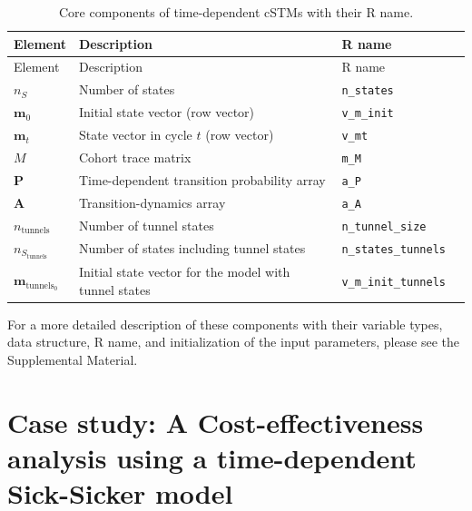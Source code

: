\documentclass[
]{article}
\begin{document}
\begin{longtable}[]{@{}
  >{\raggedright\arraybackslash}p{}
  >{\raggedright\arraybackslash}p{}
  >{\centering\arraybackslash}p{}
  >{\raggedright\arraybackslash}p{}@{}}
\caption{\label{tab:Timedep-cSTM-components-table} Core components of time-dependent cSTMs with their R name.}\tabularnewline
\toprule
Element & Description & R name & \\
\midrule
\endfirsthead
\toprule
Element & Description & R name & \\
\midrule
\endhead
\(n_S\) & Number of states & \texttt{n\_states} & \\
\(\mathbf{m}_0\) & Initial state vector (row vector) & \texttt{v\_m\_init} & \\
\(\mathbf{m}_t\) & State vector in cycle \(t\) (row vector) & \texttt{v\_mt} & \\
\(M\) & Cohort trace matrix & \texttt{m\_M} & \\
\(\mathbf{P}\) & Time-dependent transition probability array & \texttt{a\_P} & \\
\(\mathbf{A}\) & Transition-dynamics array & \texttt{a\_A} & \\
\(n_{\text{tunnels}}\) & Number of tunnel states & \texttt{n\_tunnel\_size} & \\
\(n_{S_{\text{tunnels}}}\) & Number of states including tunnel states & \texttt{n\_states\_tunnels} & \\
\(\mathbf{m}_{\text{tunnels}_0}\) & Initial state vector for the model with tunnel states & \texttt{v\_m\_init\_tunnels} & \\
\bottomrule
\end{longtable}

For a more detailed description of these components with their variable types, data structure, R name, and initialization of the input parameters, please see the Supplemental Material.

\hypertarget{case-study-a-cost-effectiveness-analysis-using-a-time-dependent-sick-sicker-model}{%
\section{Case study: A Cost-effectiveness analysis using a time-dependent Sick-Sicker model}\label{case-study-a-cost-effectiveness-analysis-using-a-time-dependent-sick-sicker-model}}
\end{document}
